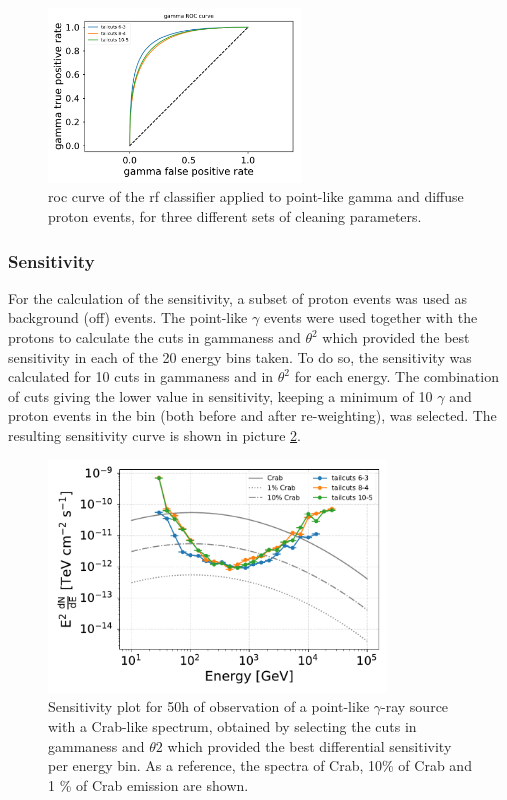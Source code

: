 \documentclass[main.tex]{subfiles}
\begin{document}
\begin{figure}[h]
\centering
 \includegraphics[width=0.6\textwidth]{Pictures/ROC.pdf}
  \caption{\gls{roc} curve of the \gls{rf} classifier applied to point-like gamma and diffuse proton events, for three different sets of cleaning parameters.}
    \label{fig:roc}
\end{figure}


\subsubsection{Sensitivity}

For the calculation of the sensitivity, a subset of proton events was used as background (off) events. The point-like $\gamma$ events were used together with the protons to calculate the cuts in gammaness and $\theta^2$ which provided the best sensitivity in each of the 20 energy bins taken. To do so, the sensitivity was calculated for 10 cuts in gammaness and in $\theta^2$ for each energy. The combination of cuts giving the lower value in sensitivity, keeping a minimum of 10 $\gamma$ and proton events in the bin (both before and after re-weighting), was selected. The resulting sensitivity curve is shown in picture \ref{fig:sens}.   

\begin{figure}[h]
\centering
 \includegraphics[width=0.8\textwidth]{Pictures/sensitivity.pdf}
  \caption{Sensitivity plot for 50h of observation of a point-like $\gamma$-ray source with a Crab-like spectrum, obtained by selecting the cuts in gammaness and $\theta2$ which provided the best differential sensitivity per energy bin. As a reference, the spectra of Crab, 10\% of Crab and 1 \% of Crab emission are shown.}
    \label{fig:sens}
\end{figure}
\end{document}
